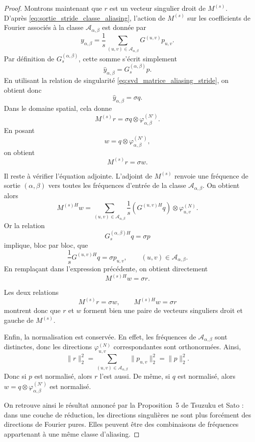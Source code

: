 \begin{proof}
Montrons maintenant que $r$ est un vecteur singulier droit de $M^{(s)}$. D'après
\eqref{eq:sortie_stride_classe_aliasing}, l'action de $M^{(s)}$ sur les coefficients de Fourier
associés à la classe $\mathcal{A}_{\alpha,\beta}$ est donnée par
\[
    \widehat{y}_{\alpha,\beta}
    =
    \frac{1}{s}
    \sum_{(u,v)\in\mathcal{A}_{\alpha,\beta}}
    G^{(u,v)}p_{u,v}.
\]
Par définition de $G_s^{(\alpha,\beta)}$, cette somme s'écrit simplement
\[
    \widehat{y}_{\alpha,\beta}
    =
    G_s^{(\alpha,\beta)}p.
\]
En utilisant la relation de singularité \eqref{eq:svd_matrice_aliasing_stride}, on obtient donc
\[
    \widehat{y}_{\alpha,\beta}
    =
    \sigma q.
\]
Dans le domaine spatial, cela donne
\[
    M^{(s)}r
    =
    \sigma q\otimes \varphi_{\alpha,\beta}^{(N')}.
\]
En posant
\[
    w
    =
    q\otimes \varphi_{\alpha,\beta}^{(N')},
\]
on obtient
\begin{equation}
    M^{(s)}r = \sigma w.
    \label{eq:relation_singuliere_stride_droite}
\end{equation}

Il reste à vérifier l'équation adjointe. L'adjoint de $M^{(s)}$ renvoie une fréquence de sortie
$(\alpha,\beta)$ vers toutes les fréquences d'entrée de la classe
$\mathcal{A}_{\alpha,\beta}$. On obtient alors
\[
    M^{(s)H}w
    =
    \sum_{(u,v)\in\mathcal{A}_{\alpha,\beta}}
    \frac{1}{s}
    \left(
        G^{(u,v)H}q
    \right)
    \otimes
    \varphi_{u,v}^{(N)}.
\]
Or la relation
\[
    G_s^{(\alpha,\beta)H}q=\sigma p
\]
implique, bloc par bloc, que
\[
    \frac{1}{s}G^{(u,v)H}q
    =
    \sigma p_{u,v},
    \qquad
    (u,v)\in\mathcal{A}_{\alpha,\beta}.
\]
En remplaçant dans l'expression précédente, on obtient directement
\begin{equation}
    M^{(s)H}w
    =
    \sigma r.
    \label{eq:relation_singuliere_stride_gauche}
\end{equation}

Les deux relations
\[
    M^{(s)}r=\sigma w,
    \qquad
    M^{(s)H}w=\sigma r
\]
montrent donc que $r$ et $w$ forment bien une paire de vecteurs singuliers droit et gauche
de $M^{(s)}$.

Enfin, la normalisation est conservée. En effet, les fréquences de
$\mathcal{A}_{\alpha,\beta}$ sont distinctes, donc les directions
$\varphi_{u,v}^{(N)}$ correspondantes sont orthonormées. Ainsi,
\[
    \|r\|_2^2
    =
    \sum_{(u,v)\in\mathcal{A}_{\alpha,\beta}}
    \|p_{u,v}\|_2^2
    =
    \|p\|_2^2.
\]
Donc si $p$ est normalisé, alors $r$ l'est aussi. De même, si $q$ est normalisé,
alors $w=q\otimes \varphi_{\alpha,\beta}^{(N')}$ est normalisé.

On retrouve ainsi le résultat annoncé par la Proposition~5 de Tsuzuku et Sato
\cite{tsuzuku2019structural} : dans une couche de réduction, les directions singulières
ne sont plus forcément des directions de Fourier pures. Elles peuvent être des combinaisons
de fréquences appartenant à une même classe d'aliasing.

\end{proof}

